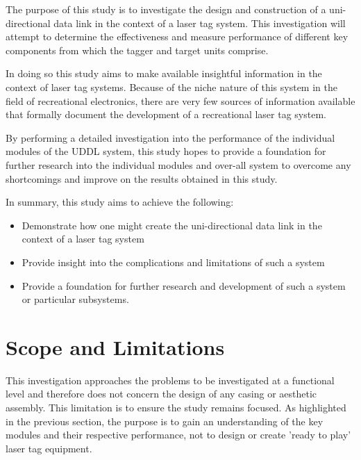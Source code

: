 

The purpose of this study is to investigate the design and construction of a uni-directional data link in the context of a laser tag system. This investigation will attempt to determine the effectiveness and measure performance of different key components from which the tagger and target units comprise.

In doing so this study aims to make available insightful information in the context of laser tag systems. Because of the niche nature of this system in the field of recreational electronics, there are very few sources of information available that formally document the development of a recreational laser tag system.

By performing a detailed investigation into the performance of the individual modules of the UDDL system, this study hopes to provide a foundation for further research into the individual modules and over-all system to overcome any shortcomings and improve on the results obtained in this study.

In summary, this study aims to achieve the following:

\begin{itemize}
	\item Demonstrate how one might create the uni-directional data link in the context of a laser tag system
	\item Provide insight into the complications and limitations of such a system
	\item Provide a foundation for further research and development of such a system or particular subsystems.
\end{itemize}


\section{Scope and Limitations}

This investigation approaches the problems to be investigated at a functional level and therefore does not concern the design of any casing or aesthetic assembly. This limitation is to ensure the study remains focused. As highlighted in the previous section, the purpose is to gain an understanding of the key modules and their respective performance, not to design or create 'ready to play' laser tag equipment.


